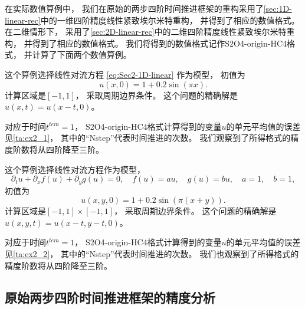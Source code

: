 在实际数值算例中，
我们在原始的两步四阶时间推进框架的重构采用了\cref{sec:1D-linear-rec}中的一维四阶精度线性紧致埃尔米特重构，
并得到了相应的数值格式。
在二维情形下，
采用了\cref{sec:2D-linear-rec}中的二维四阶精度线性紧致埃尔米特重构，
并得到了相应的数值格式。
我们将得到的数值格式记作S2O4-origin-HC4格式，
并计算了下面两个数值算例。

\begin{example}[一维线性对流方程的精度测试]
  \label{ex:Sec2-1D}
  这个算例选择线性对流方程 \cref{eq:Sec2-1D-linear} 作为模型，
  初值为
  \begin{equation}
    u(x, 0) = 1 + 0.2\sin(\pi x).
  \end{equation}
  计算区域是$[-1,1]$，
  采取周期边界条件。
  这个问题的精确解是$u(x,t) = u(x-t,0)$。
\end{example}

对应于时间$t^{tem}=1$，
S2O4-origin-HC4格式计算得到的变量$u$的单元平均值的误差见\cref{ta:ex2_1}，
其中的“Nstep”代表时间推进的次数。
我们观察到了所得格式的精度阶数将从四阶降至三阶。



\begin{example}[二维线性对流方程的精度测试]
  \label{ex:Sec2-2D}
  这个算例选择线性对流方程作为模型，
  \begin{equation}
    {\partial_{t}} u + {\partial_{x}} f(u) + {\partial_{y}} g(u) = 0, \quad f(u) = au, \quad g(u) = bu, \quad a=1, \quad b=1,
  \end{equation}
  初值为
  \begin{equation}
    u(x,y,0) = 1 + 0.2\sin(\pi (x+y)).
  \end{equation}
  计算区域是$[-1,1]\times[-1,1]$，
  采取周期边界条件。
  这个问题的精确解是$u(x,y,t) = u(x-t,y-t,0)$。
\end{example}

对应于时间$t^{tem}=1$，
S2O4-origin-HC4格式计算得到的变量$u$的单元平均值的误差见\cref{ta:ex2_2}，
其中的“Nstep”代表时间推进的次数。
我们也观察到了所得格式的精度阶数将从四阶降至三阶。



\subsection{原始两步四阶时间推进框架的精度分析}
\label{sec:origin-JD}

